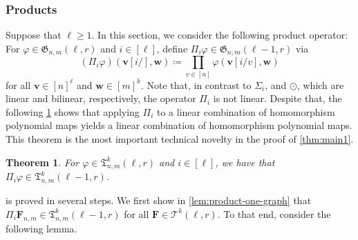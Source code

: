 \documentclass[11pt, DIV=15]{scrarticle}
\theoremstyle{definition}
\theoremstyle{plain}
\newtheorem{theorem}[definition]{Theorem}
\theoremstyle{remark}
\renewcommand{\phi}{\varphi}
\begin{document}
	\subsubsection{Products}
	
	Suppose that $\ell \geq 1$.
	In this section, we consider the following product operator:
	For $\phi \in \mathfrak{G}_{n,m}(\ell, r)$ and $i \in [\ell]$,
	define $\Pi_i \phi \in \mathfrak{G}_{n,m}(\ell-1, r)$ via 
	\[ (\Pi_i \phi)(\boldsymbol{v}[i/], \boldsymbol{w}) \coloneqq \prod_{v \in [n]} \phi(\boldsymbol{v}[i/v], \boldsymbol{w}) \] 
	for all $\boldsymbol{v} \in [n]^\ell$ and $\boldsymbol{w} \in [m]^k$.
	Note that, in contrast to $\Sigma_i$, and $\odot$,
	which are linear and bilinear, respectively,
	the operator $\Pi_i$ is not linear.
	Despite that, the following \cref{thm:product-lincomb} shows that applying $\Pi_i$ to a linear combination of homomorphism polynomial maps yields a linear combination of homomorphism polynomial maps.
	This theorem is the most important technical novelty in the proof of \cref{thm:main1}.
	
	\begin{theorem}\label{thm:product-lincomb}
		For $\phi \in \mathfrak{T}^k_{n,m}(\ell,r )$ and $i \in [\ell]$,
		we have that $\Pi_i\phi \in \mathfrak{T}^k_{n,m}(\ell-1, r)$.
	\end{theorem}
	
	
	 is proved in several steps.
	We first show in \cref{lem:product-one-graph} that $\Pi_i \boldsymbol{F}_{n,m} \in \mathfrak{T}^k_{n,m}(\ell-1, r)$ for all $\boldsymbol{F} \in \mathcal{T}^k(\ell, r)$.
	To that end, consider the following lemma.
	
\end{document}
